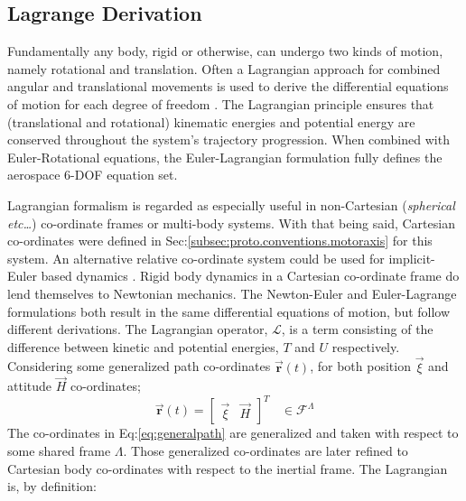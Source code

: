 \subsection{Lagrange Derivation}
\label{subsec:dynamics.rigidbody.lagrange}
Fundamentally any body, rigid or otherwise, can undergo two kinds of motion, namely rotational and translation. Often a Lagrangian approach for combined angular and translational movements is used to derive the differential equations of motion for each degree of freedom \cite{classicaldynamics,rotationrigidbody}. The Lagrangian principle ensures that (translational and rotational) kinematic energies and potential energy are conserved throughout the system's trajectory progression. When combined with Euler-Rotational equations, the Euler-Lagrangian\cite{lagrange-formalism} formulation fully defines the aerospace 6-DOF equation set.
\par
Lagrangian formalism is regarded as especially useful in non-Cartesian (\emph{spherical etc\ldots}) co-ordinate frames or multi-body systems. With that being said, Cartesian co-ordinates were defined in Sec:\ref{subsec:proto.conventions.motoraxis} for this system. An alternative relative co-ordinate system could be used for implicit-Euler based dynamics \cite{autonomousrobotseuler}.
Rigid body dynamics in a Cartesian co-ordinate frame do lend themselves to Newtonian mechanics. The Newton-Euler and Euler-Lagrange formulations both result in the same differential equations of motion, but follow different derivations. The Lagrangian operator, $\mathcal{L}$, is a term consisting of the difference between kinetic and potential energies, $T$ and $U$ respectively. Considering some generalized path co-ordinates $\vec{\mathbf{r}}(t)$, for both position $\vec{\xi}$ and attitude $\vec{H}$ co-ordinates;
\begin{equation}\label{eq:generalpath}
\vec{\mathbf{r}}(t)=\begin{bmatrix}
\vec{\xi} & \vec{H}
\end{bmatrix}^T~~~~\in\mathcal{F}^{\Lambda}
\end{equation}
The co-ordinates in Eq:\ref{eq:generalpath} are generalized and taken with respect to some shared frame $\Lambda$. Those generalized co-ordinates are later refined to Cartesian body co-ordinates with respect to the inertial frame. The Lagrangian is, by definition:
